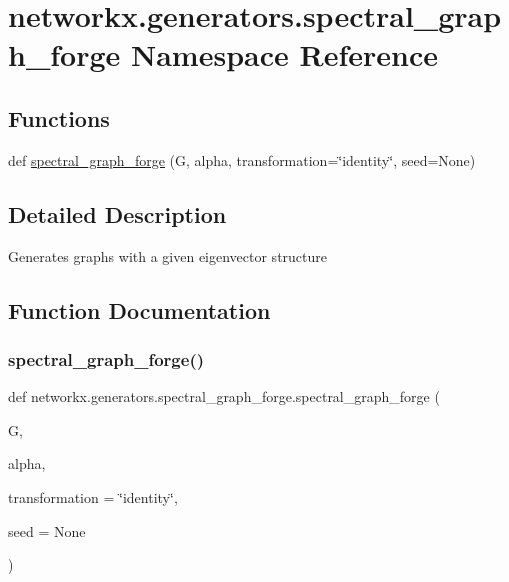 \hypertarget{namespacenetworkx_1_1generators_1_1spectral__graph__forge}{}\section{networkx.\+generators.\+spectral\+\_\+graph\+\_\+forge Namespace Reference}
\label{namespacenetworkx_1_1generators_1_1spectral__graph__forge}
\subsection*{Functions}
\begin{DoxyCompactItemize}
\item 
def \hyperlink{namespacenetworkx_1_1generators_1_1spectral__graph__forge_a6184a71f260764505d9a696737074626}{spectral\+\_\+graph\+\_\+forge} (G, alpha, transformation=\char`\"{}identity\char`\"{}, seed=None)
\end{DoxyCompactItemize}


\subsection{Detailed Description}
\begin{DoxyVerb}Generates graphs with a given eigenvector structure\end{DoxyVerb}
 

\subsection{Function Documentation}
\mbox{\label{namespacenetworkx_1_1generators_1_1spectral__graph__forge_a6184a71f260764505d9a696737074626}} 
\subsubsection{\texorpdfstring{spectral\+\_\+graph\+\_\+forge()}{spectral\_graph\_forge()}}
{\footnotesize\ttfamily def networkx.\+generators.\+spectral\+\_\+graph\+\_\+forge.\+spectral\+\_\+graph\+\_\+forge (\begin{DoxyParamCaption}\item[{}]{G,  }\item[{}]{alpha,  }\item[{}]{transformation = {\ttfamily \char`\"{}identity\char`\"{}},  }\item[{}]{seed = {\ttfamily None} }\end{DoxyParamCaption})}

